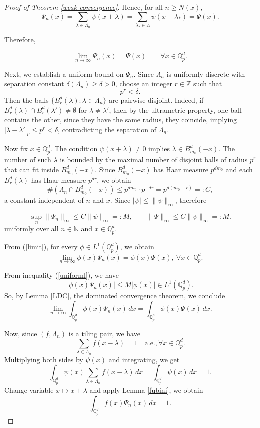 \documentclass[a4paper,12pt]{amsart}
\def\Q{\mathbb{Q}}
\def\Qp{\mathbb{Q}_p}
\begin{document}
\begin{proof}[Proof of Theorem \ref{weak convergence}]
Hence, for all $n\ge N(x)$,
\[
\Psi_n(x)=\sum_{\lambda\in\Lambda_n}\psi(x+\lambda)
        =\sum_{\lambda_*\in\Lambda}\psi(x+\lambda_*)=\Psi(x).
\]

Therefore,

\begin{equation}\label{limit}
\lim_{n\to\infty}\Psi_n(x)=\Psi(x)\qquad \forall x\in\mathbb Q_p^d.
\end{equation}

Next,  we establish a uniform bound on  $\Psi_n$. Since $\Lambda_n$ is uniformly discrete
with separation constant $\delta(\Lambda_n)\ge \delta>0$, choose an integer $r\in\mathbb{Z}$ such that
\[
p^r<\delta.
\]
Then the balls $\{B_r^d(\lambda): \lambda\in\Lambda_n\}$ are pairwise disjoint. Indeed,
if $B_r^d(\lambda)\cap B_r^d(\lambda')\neq\emptyset$ for $\lambda\neq\lambda'$, then by the
ultrametric property, one ball contains the other,  since they have the same radius, they coincide,
implying $|\lambda-\lambda'|_p\le p^r<\delta$, contradicting the separation of $\Lambda_n$.

Now fix $x\in \Qp^d$. The condition $\psi(x+\lambda)\neq 0$ implies $\lambda\in B_{m_0}^d(-x)$.
The number of such $\lambda$ is bounded by the maximal number of disjoint balls of radius $p^r$ that
can fit inside $B_{m_0}^d(-x)$. Since $B_{m_0}^d(-x)$ has Haar measure $p^{d m_0}$ and each $B_r^d(\lambda)$
has Haar measure $p^{d r}$, we obtain
\[
\#(\Lambda_n\cap B_{m_0}^d(-x)) \le p^{d m_0}\cdot p^{-d r}=p^{d(m_0-r)}=:C,
\]
a constant independent of $n$ and $x$. Since $|\psi|\le \|\psi\|_\infty$,
therefore

\begin{equation}\label{uniforml}
\sup_{n}\|\Psi_n\|_\infty\le C\|\psi\|_\infty=: M,\qquad \|\Psi\|_\infty\le  C\|\psi\|_\infty=:M.
\end{equation}
uniformly over all $n\in\mathbb{N}$ and $x\in\Qp^d$.



From (\ref{limit}), for every $\phi\in L^1(\Qp^d)$,
we obtain  $$\lim_{n\to\infty}\phi(x)\Psi_n(x)=\phi(x)\Psi(x), \ \forall x\in\mathbb Q_p^d.$$

From inequality (\ref{uniforml}), we have
$$|\phi(x)\Psi_n(x)|\leq M|\phi(x)|\in L^1(\Qp^d).$$ So,
by Lemma \ref{LDC}, the dominated convergence theorem, we conclude
\[
\lim_{n\to\infty}\int_{\mathbb Q_p^d} \phi(x)\Psi_n(x)\,dx
= \int_{\mathbb Q_p^d} \phi(x)\Psi(x)\,dx.
\]



Now, since $(f, \Lambda_n)$ is a tiling pair, we have
\[
\sum_{\lambda \in \Lambda_n} f(x - \lambda) = 1 \quad \text{a.e.}, \forall  x \in \Q_p^d.
\]
Multiplying both sides by $\psi(x)$ and integrating, we get
\[
\int_{\Qp^d} \psi(x) \sum_{\lambda \in \Lambda_n} f(x - \lambda) \, dx = \int_{\Qp^d} \psi(x) \, dx = 1.
\]
Change variable $x \mapsto x + \lambda$ and apply Lemma \ref{fubini}, we obtain
\[
\int_{\Qp^d} f(x) \Psi_n(x) \, dx = 1.%
\]


\end{proof}
\end{document}
